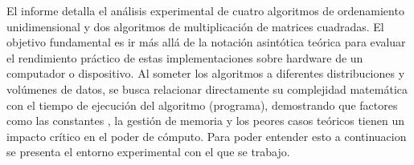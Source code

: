 El informe detalla el análisis experimental de cuatro algoritmos de ordenamiento unidimensional y dos algoritmos de multiplicación de matrices cuadradas. El objetivo fundamental es ir más allá de la notación asintótica teórica para evaluar el rendimiento práctico de estas implementaciones sobre hardware de un computador o dispositivo. Al someter los algoritmos a diferentes distribuciones y volúmenes de datos, se busca relacionar directamente su complejidad matemática con el tiempo de ejecución del algoritmo (programa), demostrando que factores como las constantes , la gestión de memoria y los peores casos teóricos tienen un impacto crítico en el poder de cómputo. Para poder entender esto a continuacion se presenta el entorno experimental con el que se trabajo.